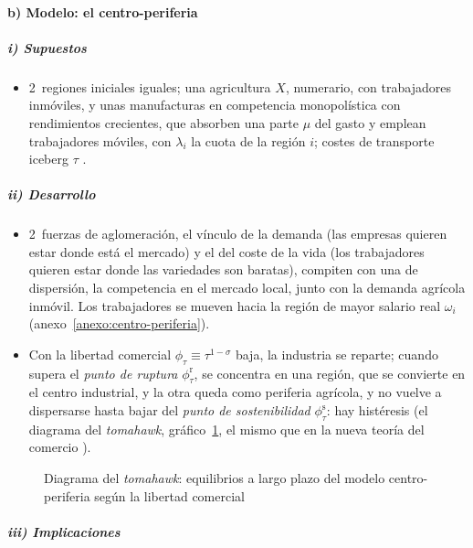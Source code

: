 \documentclass[11pt]{article}
\begin{document}
\paragraph{b) Modelo: el centro-periferia}

\subparagraph{i) Supuestos}

\begin{itemize}
\item 2~regiones iniciales iguales; una agricultura $X$, numerario, con trabajadores inmóviles, y unas manufacturas en competencia monopolística con rendimientos crecientes, que absorben una parte $\mu$ del gasto y emplean trabajadores móviles, con $\lambda_i$ la cuota de la región $i$; costes de transporte iceberg $\tau$\nocite{Krugman1991Increasing} .
\end{itemize}

\subparagraph{ii) Desarrollo}

\begin{itemize}
\item 2~fuerzas de aglomeración, el vínculo de la demanda (las empresas quieren estar donde está el mercado) y el del coste de la vida (los trabajadores quieren estar donde las variedades son baratas), compiten con una de dispersión, la competencia en el mercado local, junto con la demanda agrícola inmóvil. Los trabajadores se mueven hacia la región de mayor salario real $\omega_i$ (anexo~\ref{anexo:centro-periferia}).
\item Con la libertad comercial $\phi_\tau\equiv\tau^{1-\sigma}$ baja, la industria se reparte; cuando supera el \emph{punto de ruptura} $\phi^{\mathrm r}_\tau$, se concentra en una región, que se convierte en el centro industrial, y la otra queda como periferia agrícola, y no vuelve a dispersarse hasta bajar del \emph{punto de sostenibilidad} $\phi^{\mathrm s}_\tau$: hay histéresis (el diagrama del \emph{tomahawk}, gráfico~\ref{fig:tomahawk}, el mismo que en la nueva teoría del comercio ).
\end{itemize}
\begin{figure}[H]
\centering
\caption{Diagrama del \emph{tomahawk}: equilibrios a largo plazo del modelo centro-periferia según la libertad comercial}\label{fig:tomahawk}
\end{figure}

\subparagraph{iii) Implicaciones}
\end{document}
